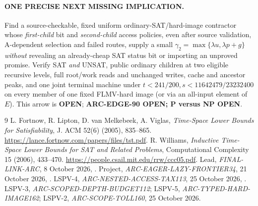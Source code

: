 \documentclass[11pt]{article}
\begin{document}
\paragraph{ONE PRECISE NEXT MISSING IMPLICATION.}
Find a source-checkable, fixed uniform
ordinary-SAT/hard-image contractor
whose \emph{first-child} bit and
\emph{second-child} access policies,
even after source validation,
A-dependent selection and failed
routes, supply a small
\(\gamma_2=\max\{\lambda u,
\lambda p+g\}\) \emph{without}
revealing an already-cheap SAT
status bit or importing an
unproved promise. Verify
SAT \emph{and} UNSAT, public
ordinary children at two eligible
recursive levels, full root/work
reads and unchanged writes, cache
and ancestor peaks, and one joint
terminal machine under
\(t<241/200,s<11642479/23232400\)
on every member of one fixed
FLMV-hard image (or via an
all-input element of \(E\)).
This arrow is \textbf{OPEN};
\textbf{ARC-EDGE-90 OPEN;
P versus NP OPEN}.

\begin{thebibliography}{9}
L. Fortnow, R. Lipton, D. van Melkebeek, A. Viglas,
\emph{Time-Space Lower Bounds for Satisfiability},
J. ACM 52(6) (2005), 835--865.
\url{https://lance.fortnow.com/papers/files/tst.pdf}.
R. Williams,
\emph{Inductive Time-Space Lower Bounds for SAT and Related Problems},
Computational Complexity 15 (2006), 433--470.
\url{https://people.csail.mit.edu/rrw/ccc05.pdf}.
Lead, \emph{FINAL-LINK-ARC}, 8 October 2026,
.
Project, \emph{ARC-EAGER-LAZY-FRONTIER34}, 21 October 2026,
.
LSPV-4, \emph{ARC-NESTED-ACCESS-TAX113}, 25 October 2026,
.
LSPV-3, \emph{ARC-SCOPED-DEPTH-BUDGET112};
LSPV-5, \emph{ARC-TYPED-HARD-IMAGE162};
LSPV-2, \emph{ARC-SCOPE-TOLL160}, 25 October 2026.
\end{thebibliography}
\end{document}
